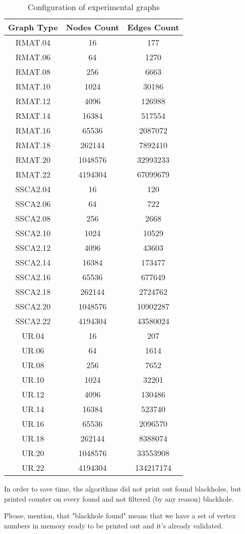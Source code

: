 \begin{table}[]
	\caption{Configuration of experimental graphs}
	\label{tabular:graphs}
	\begin{center}
		\begin{tabular}{c|c|c}
			Graph Type & Nodes Count & Edges Count \\
			\hline
			RMAT.04 & 16 & 177 \\
			RMAT.06 & 64 & 1270 \\
			RMAT.08 & 256 & 6663 \\
			RMAT.10 & 1024 & 30186 \\
			RMAT.12 & 4096 & 126988 \\
			RMAT.14 & 16384 & 517554 \\
			RMAT.16 & 65536 & 2087072 \\
			RMAT.18 & 262144 & 7892410 \\
			RMAT.20 & 1048576 & 32993233 \\
			RMAT.22 & 4194304 & 67099679 \\
			SSCA2.04 & 16 & 120 \\
			SSCA2.06 & 64 & 722 \\
			SSCA2.08 & 256 & 2668 \\
			SSCA2.10 & 1024 & 10529 \\
			SSCA2.12 & 4096 & 43603 \\
			SSCA2.14 & 16384 & 173477 \\
			SSCA2.16 & 65536 & 677649 \\
			SSCA2.18 & 262144 & 2724762 \\
			SSCA2.20 & 1048576 & 10902287 \\
			SSCA2.22 & 4194304 & 43580024 \\
			UR.04 & 16 & 207 \\
			UR.06 & 64 & 1614 \\
			UR.08 & 256 & 7652 \\
			UR.10 & 1024 & 32201 \\
			UR.12 & 4096 & 130486 \\
			UR.14 & 16384 & 523740 \\
			UR.16 & 65536 & 2096570 \\
			UR.18 & 262144 & 8388074 \\
			UR.20 & 1048576 & 33553908 \\
			UR.22 & 4194304 & 134217174
		\end{tabular}
	\end{center}
\end{table}

 In order to save time,
the algorithms did not print out found blackholes, but printed counter on every found and not filtered (by any reason) blackhole.

Please, mention, that "blackhole found" means that we have a set of vertex numbers in memory ready to be printed out and it's already validated.